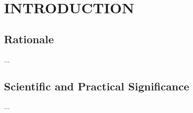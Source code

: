 %

\chapter{INTRODUCTION}
\label{chap:introduction}

\section{Rationale}
...

\section{Scientific and Practical Significance}
...

